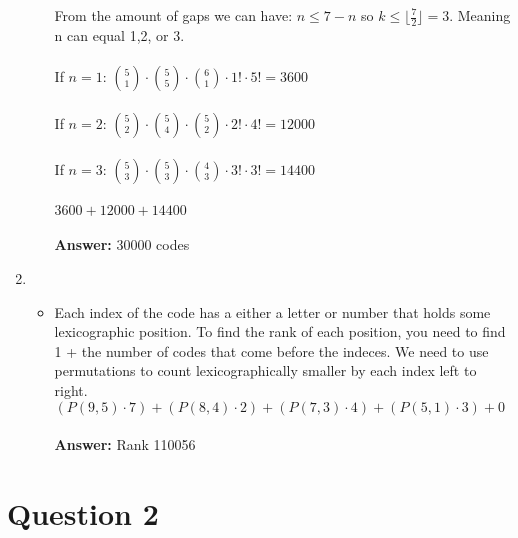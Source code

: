 \documentclass[11pt]{article}
\begin{document}
\begin{enumerate}[label=(\alph*)]
\begin{itemize}
            From the amount of gaps we can have: \(n \leq 7-n\) so \(k \leq \lfloor \frac{7}{2} \rfloor = 3\). Meaning n can equal 1,2, or 3. \\ \\
            If \(n = 1\): \(\binom{5}{1} \cdot \binom{5}{5} \cdot \binom{6}{1} \cdot 1! \cdot 5! = 3600\) \\ \\
            If \(n = 2\): \(\binom{5}{2} \cdot \binom{5}{4} \cdot \binom{5}{2} \cdot 2! \cdot 4! = 12000\) \\ \\
            If \(n = 3\): \(\binom{5}{3} \cdot \binom{5}{3} \cdot \binom{4}{3} \cdot 3! \cdot 3! = 14400\) \\ \\
            \(3600+12000+14400\) \\ \\
            \textbf{Answer:} 30000 codes
        \end{itemize}
        \item
        \begin{itemize}
            \item[] Each index of the code has a either a letter or number that holds some lexicographic position. To find the rank of each position, you need to find 1 + the number of codes that come before the indeces. We need to use permutations to count lexicographically smaller by each index left to right. \\
            \((P(9,5) \cdot 7) + (P(8,4) \cdot 2) + (P(7,3) \cdot 4) + (P(5,1) \cdot 3) + 0\) \\ \\
            \textbf{Answer:} Rank 110056
        \end{itemize}
    \end{enumerate}

\clearpage
\section*{Question 2}
\end{document}

